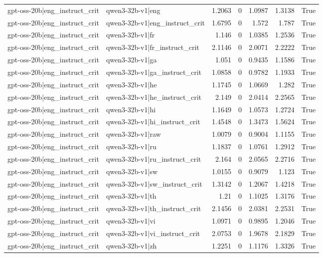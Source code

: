 \begin{table}
\begin{tabular}{l l r r r r l}
gpt-oss-20b|eng_instruct_crit & qwen3-32b-v1|eng & 1.2063 & 0 & 1.0987 & 1.3138 & True \\
gpt-oss-20b|eng_instruct_crit & qwen3-32b-v1|eng_instruct_crit & 1.6795 & 0 & 1.572 & 1.787 & True \\
gpt-oss-20b|eng_instruct_crit & qwen3-32b-v1|fr & 1.146 & 0 & 1.0385 & 1.2536 & True \\
gpt-oss-20b|eng_instruct_crit & qwen3-32b-v1|fr_instruct_crit & 2.1146 & 0 & 2.0071 & 2.2222 & True \\
gpt-oss-20b|eng_instruct_crit & qwen3-32b-v1|ga & 1.051 & 0 & 0.9435 & 1.1586 & True \\
gpt-oss-20b|eng_instruct_crit & qwen3-32b-v1|ga_instruct_crit & 1.0858 & 0 & 0.9782 & 1.1933 & True \\
gpt-oss-20b|eng_instruct_crit & qwen3-32b-v1|he & 1.1745 & 0 & 1.0669 & 1.282 & True \\
gpt-oss-20b|eng_instruct_crit & qwen3-32b-v1|he_instruct_crit & 2.149 & 0 & 2.0414 & 2.2565 & True \\
gpt-oss-20b|eng_instruct_crit & qwen3-32b-v1|hi & 1.1649 & 0 & 1.0573 & 1.2724 & True \\
gpt-oss-20b|eng_instruct_crit & qwen3-32b-v1|hi_instruct_crit & 1.4548 & 0 & 1.3473 & 1.5624 & True \\
gpt-oss-20b|eng_instruct_crit & qwen3-32b-v1|raw & 1.0079 & 0 & 0.9004 & 1.1155 & True \\
gpt-oss-20b|eng_instruct_crit & qwen3-32b-v1|ru & 1.1837 & 0 & 1.0761 & 1.2912 & True \\
gpt-oss-20b|eng_instruct_crit & qwen3-32b-v1|ru_instruct_crit & 2.164 & 0 & 2.0565 & 2.2716 & True \\
gpt-oss-20b|eng_instruct_crit & qwen3-32b-v1|sw & 1.0155 & 0 & 0.9079 & 1.123 & True \\
gpt-oss-20b|eng_instruct_crit & qwen3-32b-v1|sw_instruct_crit & 1.3142 & 0 & 1.2067 & 1.4218 & True \\
gpt-oss-20b|eng_instruct_crit & qwen3-32b-v1|th & 1.21 & 0 & 1.1025 & 1.3176 & True \\
gpt-oss-20b|eng_instruct_crit & qwen3-32b-v1|th_instruct_crit & 2.1456 & 0 & 2.0381 & 2.2531 & True \\
gpt-oss-20b|eng_instruct_crit & qwen3-32b-v1|vi & 1.0971 & 0 & 0.9895 & 1.2046 & True \\
gpt-oss-20b|eng_instruct_crit & qwen3-32b-v1|vi_instruct_crit & 2.0753 & 0 & 1.9678 & 2.1829 & True \\
gpt-oss-20b|eng_instruct_crit & qwen3-32b-v1|zh & 1.2251 & 0 & 1.1176 & 1.3326 & True \\

\end{tabular}
\end{table}

